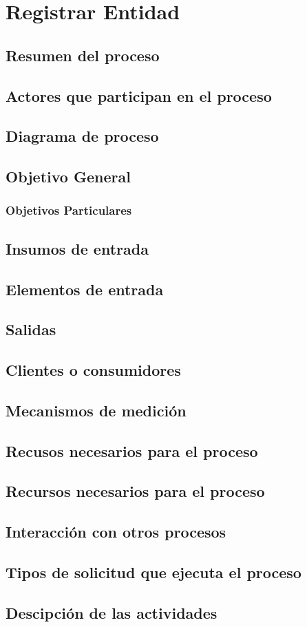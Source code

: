 \hypertarget{procesoRegistrarEntidad}{}
\section{Registrar Entidad}
\subsection{Resumen del proceso}
\subsection{Actores que participan en el proceso}
\subsection{Diagrama de proceso}
\subsection{Objetivo General}
\subsubsection{Objetivos Particulares}
\subsection{Insumos de entrada}
\subsection{Elementos de entrada}
\subsection{Salidas}
\subsection{Clientes o consumidores}
\subsection{Mecanismos de medici\'on}
\subsection{Recusos necesarios para el proceso}
\subsection{Recursos necesarios para el proceso}
\subsection{Interacci\'on con otros procesos}
\subsection{Tipos de solicitud que ejecuta el proceso}
\subsection{Descipci\'on de las actividades}